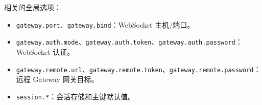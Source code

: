 相关的全局选项：

\begin{itemize}
  \item \texttt{gateway.port}、\texttt{gateway.bind}：WebSocket 主机/端口。
  \item \texttt{gateway.auth.mode}、\texttt{gateway.auth.token}、\texttt{gateway.auth.password}：WebSocket 认证。
  \item \texttt{gateway.remote.url}、\texttt{gateway.remote.token}、\texttt{gateway.remote.password}：远程 Gateway 网关目标。
  \item \texttt{session.*}：会话存储和主键默认值。
\end{itemize}



\clearpage
